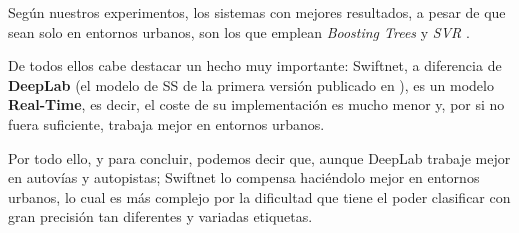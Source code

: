 Según nuestros experimentos, los sistemas con mejores resultados, a pesar de que sean solo en entornos urbanos, son los que emplean \textit{Boosting Trees} \cite{boosting-trees} y \textit{\ac{SVR}} \cite{SVR}.

De todos ellos cabe destacar un hecho muy importante: Swiftnet, a diferencia de \textbf{DeepLab} (el modelo de \ac{SS} de la primera versión publicado en \cite{xxx}), es un modelo \textbf{Real-Time}, es decir, el coste de su implementación es mucho menor y, por si no fuera suficiente, trabaja mejor en entornos urbanos.

Por todo ello, y para concluir, podemos decir que, aunque DeepLab trabaje mejor en autovías y autopistas; Swiftnet lo compensa haciéndolo mejor en entornos urbanos, lo cual es más complejo por la dificultad que tiene el poder clasificar con gran precisión tan diferentes y variadas etiquetas.
